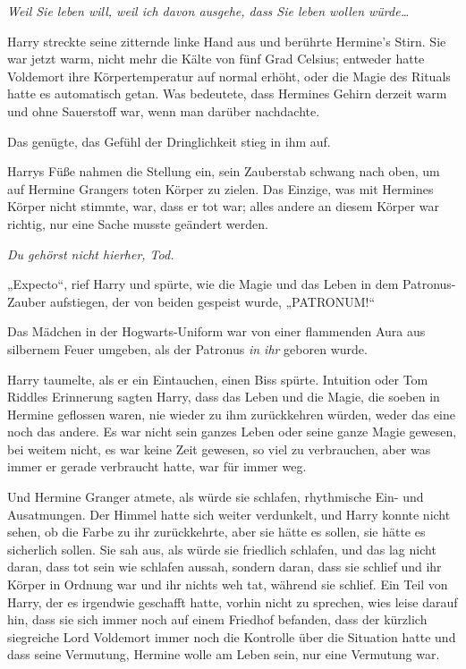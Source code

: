 {\emph{Weil Sie leben will, weil ich davon ausgehe, dass Sie leben wollen würde…}

Harry streckte seine zitternde linke Hand aus und berührte Hermine's Stirn. Sie war jetzt warm, nicht mehr die Kälte von fünf Grad Celsius; entweder hatte Voldemort ihre Körpertemperatur auf normal erhöht, oder die Magie des Rituals hatte es automatisch getan. Was bedeutete, dass Hermines Gehirn derzeit warm und ohne Sauerstoff war, wenn man darüber nachdachte.

Das genügte, das Gefühl der Dringlichkeit stieg in ihm auf.

Harrys Füße nahmen die Stellung ein, sein Zauberstab schwang nach oben, um auf Hermine Grangers toten Körper zu zielen. Das Einzige, was mit Hermines Körper nicht stimmte, war, dass er tot war; alles andere an diesem Körper war richtig, nur eine Sache musste geändert werden.

\emph{Du gehörst nicht hierher, Tod.}

„Expecto“, rief Harry und spürte, wie die Magie und das Leben in dem Patronus-Zauber aufstiegen, der von beiden gespeist wurde, „PATRONUM!“

Das Mädchen in der Hogwarts-Uniform war von einer flammenden Aura aus silbernem Feuer umgeben, als der Patronus \emph{in ihr} geboren wurde.

Harry taumelte, als er ein Eintauchen, einen Biss spürte. Intuition oder Tom Riddles Erinnerung sagten Harry, dass das Leben und die Magie, die soeben in Hermine geflossen waren, nie wieder zu ihm zurückkehren würden, weder das eine noch das andere. Es war nicht sein ganzes Leben oder seine ganze Magie gewesen, bei weitem nicht, es war keine Zeit gewesen, so viel zu verbrauchen, aber was immer er gerade verbraucht hatte, war für immer weg.

Und Hermine Granger atmete, als würde sie schlafen, rhythmische Ein- und Ausatmungen. Der Himmel hatte sich weiter verdunkelt, und Harry konnte nicht sehen, ob die Farbe zu ihr zurückkehrte, aber sie hätte es sollen, sie hätte es sicherlich sollen. Sie sah aus, als würde sie friedlich schlafen, und das lag nicht daran, dass tot sein wie schlafen aussah, sondern daran, dass sie schlief und ihr Körper in Ordnung war und ihr nichts weh tat, während sie schlief. Ein Teil von Harry, der es irgendwie geschafft hatte, vorhin nicht zu sprechen, wies leise darauf hin, dass sie sich immer noch auf einem Friedhof befanden, dass der kürzlich siegreiche Lord Voldemort immer noch die Kontrolle über die Situation hatte und dass seine Vermutung, Hermine wolle am Leben sein, nur eine Vermutung war.

}
